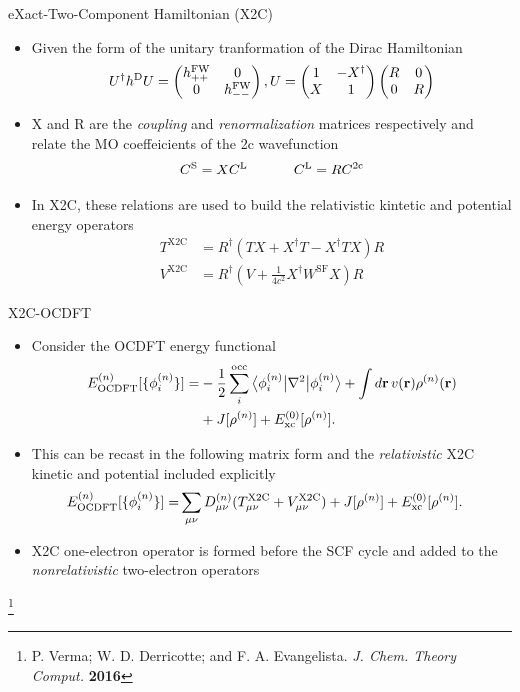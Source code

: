 \documentclass[t]{beamer}
\newcommand\blfootnote[1]{%
  \begingroup
  \renewcommand\thefootnote{}\footnote{#1}%
  \addtocounter{footnote}{-1}%
  \endgroup
}
\newcommand{\bra}[2][0]
{\ifthenelse{\equal{#1}{0}}{\left\langle #2 \right|}
{\ifthenelse{\equal{#1}{1}}{\big\langle #2 \big|}
{\ifthenelse{\equal{#1}{2}}{\Big\langle #2 \Big|}
{\ifthenelse{\equal{#1}{3}}{\bigg\langle #2 \bigg|}
{\ifthenelse{\equal{#1}{4}}{\Bigg\langle #2 \Bigg|}
{Error}}}}}
}
\newcommand{\ket}[2][0]
{\ifthenelse{\equal{#1}{0}}{\left| #2 \right\rangle}
{\ifthenelse{\equal{#1}{1}}{\big| #2 \big\rangle}
{\ifthenelse{\equal{#1}{2}}{\Big| #2 \Big\rangle}
{\ifthenelse{\equal{#1}{3}}{\bigg| #2 \bigg\rangle}
{\ifthenelse{\equal{#1}{4}}{\Bigg| #2 \Bigg\rangle}
{Error}}}}}
}
\begin{document}
\begin{frame}{eXact-Two-Component Hamiltonian (X2C)}
\begin{itemize}
\item Given the form of the unitary tranformation of the Dirac Hamiltonian
\begin{equation}
U^\dagger h^{\rm D} U = 
 \begin{pmatrix}
h^{\rm FW}_{++} & 0 \\
0 & h^{\rm FW}_{--}
\end{pmatrix},
U = 
\begin{pmatrix}
1 & -X^{\dagger} \\
X & 1
\end{pmatrix}
\begin{pmatrix}
R & 0 \\
0 & R
\end{pmatrix}
\end{equation}
\item X and R are the \textit{coupling} and \textit{renormalization} matrices respectively and relate the MO coeffeicients of the 2c wavefunction
\begin{equation}
C^{\rm S} = XC^{\rm L} \ \ \ \ \ \ \ \ \ \ C^{\rm L} = R C^{\rm 2c}
\end{equation}
\item In X2C, these relations are used to build the relativistic kintetic and potential energy operators
\begin{align}
	T^{\text{X2C}}&= R^{\dagger} (TX +  {X}^{\dagger}T - {X}^{\dagger}TX ) R \\ 
	V^{\text{X2C}} &=  R^{\dagger}(V + \frac{1}{4c^2} X^{\dagger}W^{\text{SF}}X) R
\end{align}
\end{itemize}
\end{frame}

\begin{frame}{X2C-OCDFT}
\begin{itemize}
\item Consider the OCDFT energy functional 
\begin{align}
\nonumber
E^{(n)}_{\rm OCDFT}[\{\phi^{(n)}_i\}]=& -\frac{1}{2} \sum_i^{\rm occ} \bra[1]{\phi_i^{(n)}}\nabla^2\ket[1]{\phi_i^{(n)}} + 
\int d \mathbf{r} \, v(\mathbf{r}) \rho^{(n)}(\mathbf{r})\\
 &+ J[\rho^{(n)}] + E^{(0)}_{\rm xc}[\rho^{(n)}].
\end{align}
\item This can be recast in the following matrix form and the \textit{relativistic} X2C kinetic and potential included explicitly
\begin{align}
E^{(n)}_{\rm OCDFT}[\{\phi^{(n)}_i\}]=& \sum_{\mu \nu} D^{(n)}_{\mu \nu}(T^{\rm X2C}_{\mu \nu} + V^{\rm X2C}_{\mu \nu}) + J[\rho^{(n)}] + E^{(0)}_{\rm xc}[\rho^{(n)}]. 
\end{align}
\item X2C one-electron operator is formed before the SCF cycle and added to the \textit{nonrelativistic} two-electron operators
\end{itemize}
\blfootnote{P. Verma; W. D. Derricotte; and F. A. Evangelista. \textit{J. Chem. Theory Comput.} \textbf{2016}}
\end{frame}
\end{document}
